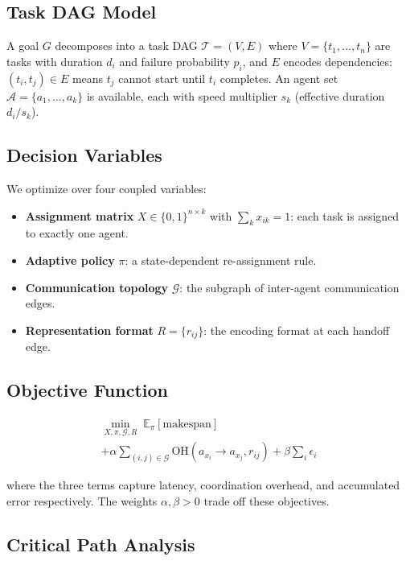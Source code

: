 \documentclass[10pt, twocolumn]{article}
\begin{document}
\subsection{Task DAG Model}

A goal $G$ decomposes into a task DAG $\mathcal{T} = (V, E)$ where $V = \{t_1, \ldots, t_n\}$ are tasks with duration $d_i$ and failure probability $p_i$, and $E$ encodes dependencies: $(t_i, t_j) \in E$ means $t_j$ cannot start until $t_i$ completes. An agent set $\mathcal{A} = \{a_1, \ldots, a_k\}$ is available, each with speed multiplier $s_k$ (effective duration $d_i / s_k$).

\subsection{Decision Variables}

We optimize over four coupled variables:
\begin{itemize}
    \item \textbf{Assignment matrix} $X \in \{0,1\}^{n \times k}$ with $\sum_k x_{ik} = 1$: each task is assigned to exactly one agent.
    \item \textbf{Adaptive policy} $\pi$: a state-dependent re-assignment rule.
    \item \textbf{Communication topology} $\mathcal{G}$: the subgraph of inter-agent communication edges.
    \item \textbf{Representation format} $R = \{r_{ij}\}$: the encoding format at each handoff edge.
\end{itemize}

\subsection{Objective Function}

\begin{multline}
\label{eq:objective}
\min_{X, \pi, \mathcal{G}, R} \; \mathbb{E}_\pi\!\left[\text{makespan}\right] \\
  + \alpha \!\sum_{(i,j) \in \mathcal{G}}\! \text{OH}(a_{x_i} \!\to\! a_{x_j}, r_{ij})
  + \beta \sum_i \epsilon_i
\end{multline}

where the three terms capture latency, coordination overhead, and accumulated error respectively. The weights $\alpha, \beta > 0$ trade off these objectives.

\subsection{Critical Path Analysis}
\end{document}

